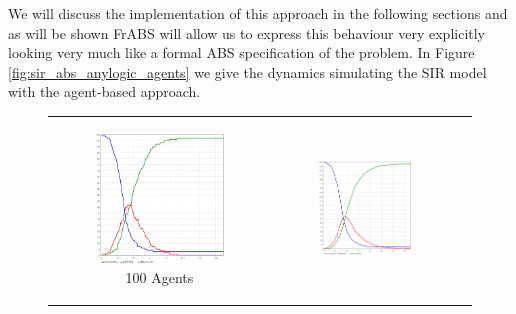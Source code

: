 We will discuss the implementation of this approach in the following sections and as will be shown FrABS will allow us to express this behaviour very explicitly looking very much like a formal ABS specification of the problem. In Figure \ref{fig:sir_abs_anylogic_agents} we give the dynamics simulating the SIR model with the agent-based approach. 
\begin{figure}
\begin{center}

	\begin{tabular}{c c c}
		\begin{subfigure}[b]{0.3\textwidth}
			\centering
			\includegraphics[width=.7\textwidth, angle=0]{./fig/SIR_ABS_ANYLOGIC_100Agents.png}
			\caption{100 Agents}
			\label{fig:pd_seq}
		\end{subfigure}
    	&
		\begin{subfigure}[b]{0.3\textwidth}
			\centering
			\includegraphics[width=.7\textwidth, angle=0]{./fig/SIR_ABS_ANYLOGIC_1000Agents.png}

\end{subfigure}
\end{tabular}
\end{center}
\end{figure}
